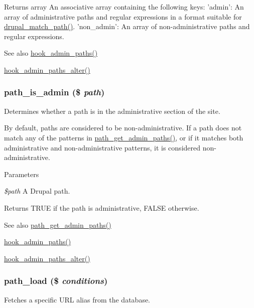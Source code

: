 \begin{DoxyReturn}{Returns}
array An associative array containing the following keys: 'admin': An array of administrative paths and regular expressions in a format suitable for \hyperlink{path_8inc_a1299e390360982cc8fbebe06f0232e18}{drupal\_\-match\_\-path()}. 'non\_\-admin': An array of non-\/administrative paths and regular expressions.
\end{DoxyReturn}
\begin{DoxySeeAlso}{See also}
\hyperlink{group__hooks_ga3fe6d93afc8bb04afbd9e3c326d1bdc1}{hook\_\-admin\_\-paths()} 

\hyperlink{group__hooks_ga027fc321194ec7bbc226ed6aff587e68}{hook\_\-admin\_\-paths\_\-alter()} 
\end{DoxySeeAlso}
\hypertarget{path_8inc_abf34fb440d7de9c9e8dfa0ec1a2ac72d}{
\subsubsection[{path\_\-is\_\-admin}]{\setlength{\rightskip}{0pt plus 5cm}path\_\-is\_\-admin (\$ {\em path})}}
\label{path_8inc_abf34fb440d7de9c9e8dfa0ec1a2ac72d}
Determines whether a path is in the administrative section of the site.

By default, paths are considered to be non-\/administrative. If a path does not match any of the patterns in \hyperlink{path_8inc_acc77f0daab31d02be34e83a61ad3991c}{path\_\-get\_\-admin\_\-paths()}, or if it matches both administrative and non-\/administrative patterns, it is considered non-\/administrative.


\begin{DoxyParams}{Parameters}
\item[{\em \$path}]A Drupal path.\end{DoxyParams}
\begin{DoxyReturn}{Returns}
TRUE if the path is administrative, FALSE otherwise.
\end{DoxyReturn}
\begin{DoxySeeAlso}{See also}
\hyperlink{path_8inc_acc77f0daab31d02be34e83a61ad3991c}{path\_\-get\_\-admin\_\-paths()} 

\hyperlink{group__hooks_ga3fe6d93afc8bb04afbd9e3c326d1bdc1}{hook\_\-admin\_\-paths()} 

\hyperlink{group__hooks_ga027fc321194ec7bbc226ed6aff587e68}{hook\_\-admin\_\-paths\_\-alter()} 
\end{DoxySeeAlso}
\hypertarget{path_8inc_ac1be3b94cdca2d9b6e9a9e78043500f2}{
\subsubsection[{path\_\-load}]{\setlength{\rightskip}{0pt plus 5cm}path\_\-load (\$ {\em conditions})}}
\label{path_8inc_ac1be3b94cdca2d9b6e9a9e78043500f2}
Fetches a specific URL alias from the database.


